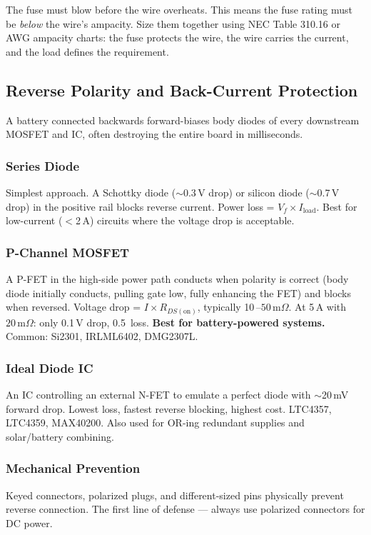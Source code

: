 \documentclass[11pt,letterpaper,twoside,openany]{book}
\newcommand{\mohm}{\,\text{m}\Omega}
\begin{document}
\begin{warningbox}
The fuse must blow before the wire overheats. This means the fuse rating must be \emph{below} the wire's ampacity. Size them together using NEC Table 310.16 or AWG ampacity charts: the fuse protects the wire, the wire carries the current, and the load defines the requirement.
\end{warningbox}


\subsection{Reverse Polarity and Back-Current Protection}
\label{sec:reverse}

A battery connected backwards forward-biases body diodes of every downstream MOSFET and IC, often destroying the entire board in milliseconds.

\subsubsection{Series Diode}
Simplest approach. A Schottky diode ($\sim$0.3\,V drop) or silicon diode ($\sim$0.7\,V drop) in the positive rail blocks reverse current. Power loss = $V_f \times I_{\text{load}}$. Best for low-current ($<$2\,A) circuits where the voltage drop is acceptable.

\subsubsection{P-Channel MOSFET}
A P-FET in the high-side power path conducts when polarity is correct (body diode initially conducts, pulling gate low, fully enhancing the FET) and blocks when reversed. Voltage drop = $I \times R_{DS(\text{on})}$, typically 10\,--$50\mohm$. At 5\,A with $20\mohm$: only 0.1\,V drop, 0.5\, loss. \textbf{Best for battery-powered systems.} Common: Si2301, IRLML6402, DMG2307L.

\subsubsection{Ideal Diode IC}
An IC controlling an external N-FET to emulate a perfect diode with $\sim$20\,mV forward drop. Lowest loss, fastest reverse blocking, highest cost. LTC4357, LTC4359, MAX40200. Also used for OR-ing redundant supplies and solar/battery combining.

\subsubsection{Mechanical Prevention}
Keyed connectors, polarized plugs, and different-sized pins physically prevent reverse connection. The first line of defense --- always use polarized connectors for DC power.
\end{document}
